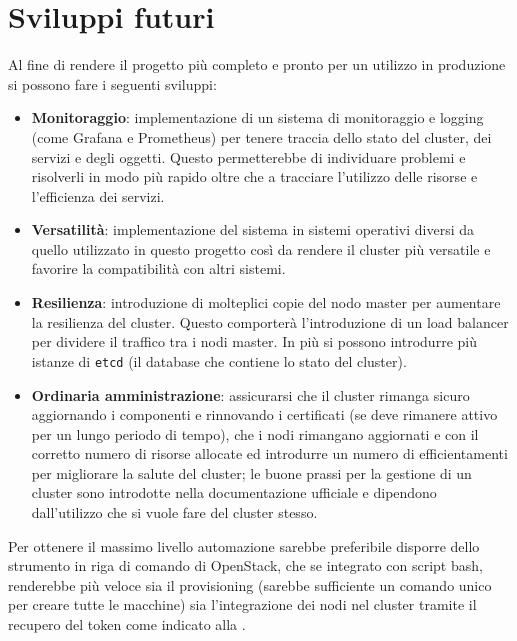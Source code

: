 \documentclass[12pt,a4paper,openright,twoside]{book}
\begin{document}
\section{Sviluppi futuri}
\label{sec:future}
Al fine di rendere il progetto più completo e pronto per un utilizzo in produzione si possono fare i seguenti sviluppi:
\begin{itemize}
    \item {\textbf{Monitoraggio}: implementazione di un sistema di monitoraggio e logging (come Grafana e Prometheus) per tenere traccia dello stato del cluster, dei servizi e degli oggetti.
    Questo permetterebbe di individuare problemi e risolverli in modo più rapido oltre che a tracciare l'utilizzo delle risorse e l'efficienza dei servizi.
    }
    \item{\textbf{Versatilità}: implementazione del sistema in sistemi operativi diversi da quello utilizzato in questo progetto così da rendere il cluster più versatile e favorire la compatibilità con altri sistemi.
    }
    \item{
        \textbf{Resilienza}: introduzione di molteplici copie del nodo master per aumentare la resilienza del cluster. Questo comporterà l'introduzione di un load balancer per dividere il traffico tra i nodi master.
        In più si possono introdurre più istanze di \texttt{etcd} (il database che contiene lo stato del cluster)\cite{kubernetes}.
    }
    \item {
        \textbf{Ordinaria amministrazione}: assicurarsi che il cluster rimanga sicuro aggiornando i componenti e rinnovando i certificati (se deve rimanere
        attivo per un lungo periodo di tempo), che i nodi rimangano aggiornati e con il corretto numero di risorse allocate ed introdurre un numero di efficientamenti
        per migliorare la salute del cluster; le buone prassi per la gestione di un cluster sono introdotte nella documentazione ufficiale e dipendono dall'utilizzo che
        si vuole fare del cluster stesso\cite{kubernetes}.
    }
\end{itemize}
Per ottenere il massimo livello automazione sarebbe preferibile disporre dello strumento in riga di comando di OpenStack, che se integrato con script bash, renderebbe 
più veloce sia il provisioning (sarebbe sufficiente un comando unico per creare tutte le macchine) sia l'integrazione dei nodi nel cluster tramite il recupero del token come indicato
alla .
\end{document}

